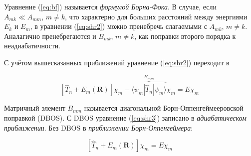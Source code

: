 \documentclass[12pt, oneside]{article}
\numberwithin{equation}{section}  %
\begin{document}
Уравнение (\ref{eq:bf}) называется \textit{формулой Борна-Фока}. В случае, если \(A_{mk} \ll A_{mm}\), \(m \neq k\), что характерно для больших расстояний между энергиями \(E_k\) и \(E_m\), в уравнении (\ref{eq:shr2}) можно пренебречь слагаемыми с \(A_{mk}\), \(m \neq k\). Аналагично пренебрегаются и \(B_{mk}\), \(m \neq k\), как поправки второго порядка к неадиабатичности.

С учётом вышесказанных приближений уравнение (\ref{eq:shr2}) переходит в

\begin{equation}
    \left[ \hat{T}_n + E_m (\bm{R}) \right] \chi_m + \overbrace{\langle \psi_m | \hat{T}_n | \psi_m \rangle}^{B_{mm}} \chi_m = E \chi_m
    \label{eq:shr3}
\end{equation}

Матричный элемент \(B_{mm}\) называется диагональной Борн-Оппенгеймееровской поправкой (DBOS).
С DBOS уравнение (\ref{eq:shr3}) записано в \textit{адиабатическом приближении}. Без DBOS в \textit{приближении Борн-Оппенгеймера}:

\begin{equation}
    \left[ \hat{T}_n + E_m (\bm{R}) \right] \chi_m = E \chi_m
\end{equation}
\end{document}

